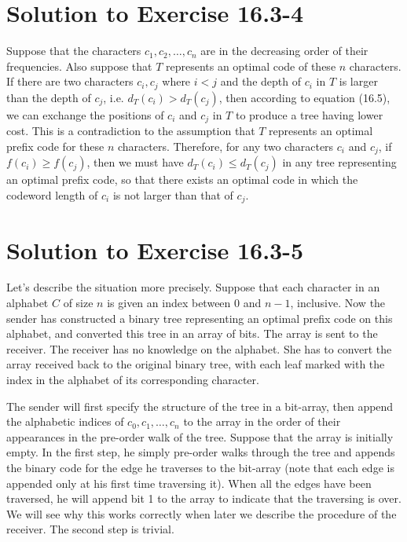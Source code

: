 \documentclass[fleqn]{article}
\begin{document}
\section*{Solution to Exercise 16.3-4}

Suppose that the characters $c_1, c_2, \ldots, c_n$ are in the
decreasing order of their frequencies. Also suppose that $T$
represents an optimal code of these $n$ characters. If there are two
characters $c_i, c_j$ where $i < j$ and the depth of $c_i$ in $T$ is
larger than the depth of $c_j$, i.e. $d_T(c_i) > d_T(c_j)$, then
according to equation (16.5), we can exchange the positions of $c_i$
and $c_j$ in $T$ to produce a tree having lower cost. This is a
contradiction to the assumption that $T$ represents an optimal prefix
code for these $n$ characters. Therefore, for any two characters $c_i$
and $c_j$, if $f(c_i) \geq f(c_j)$, then we must have $d_T(c_i) \leq
d_T(c_j)$ in any tree representing an optimal prefix code, so that
there exists an optimal code in which the codeword length of $c_i$ is
not larger than that of $c_j$.






\section*{Solution to Exercise 16.3-5}

Let's describe the situation more precisely. Suppose that each
character in an alphabet $C$ of size $n$ is given an index between 0
and $n-1$, inclusive. Now the sender has constructed a binary tree
representing an optimal prefix code on this alphabet, and converted
this tree in an array of bits. The array is sent to the receiver. The
receiver has no knowledge on the alphabet. She has to convert the
array received back to the original binary tree, with each leaf marked
with the index in the alphabet of its corresponding character.

The sender will first specify the structure of the tree in a
bit-array, then append the alphabetic indices of $c_0, c_1, \ldots,
c_n$ to the array in the order of their appearances in the pre-order
walk of the tree. Suppose that the array is initially empty. In the
first step, he simply pre-order walks through the tree and appends the
binary code for the edge he traverses to the bit-array (note that each
edge is appended only at his first time traversing it). When all the
edges have been traversed, he will append bit 1 to the array to
indicate that the traversing is over. We will see why this works
correctly when later we describe the procedure of the receiver. The
second step is trivial. 
\end{document}
